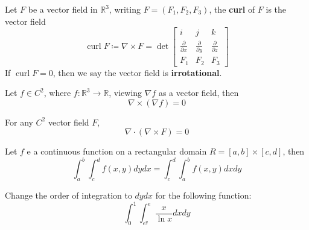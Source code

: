 \documentclass[openany]{book}
\newcommand{\R}{\mathbb{R}}
\newcommand{\curl}{\operatorname{curl}}
\begin{document}
\begin{defn}[curl]
    Let $F$ be a vector field in $\R^3$, writing $F=(F_1,F_2,F_3)$, the \textbf{curl} of $F$ is the vector field 
    \begin{equation*}
        \curl F\coloneq\nabla\times F=\det\begin{bmatrix}
            i&j&k\\
            \frac{\partial}{\partial x}&\frac{\partial}{\partial y}&\frac{\partial}{\partial z}\\
            F_1&F_2&F_3
        \end{bmatrix}
    \end{equation*}
    If $\curl F=0$, then we say the vector field is \textbf{irrotational}.
\end{defn}

\begin{prop}
    Let $f\in C^2$, where $f:\R^3\to\R$, viewing $\nabla f$ as a vector field, then
    \begin{equation*}
        \nabla\times(\nabla f)=0
    \end{equation*}    
\end{prop}

\begin{prop}
    For any $C^2$ vector field $F$, 
    \begin{equation*}
        \nabla\cdot(\nabla\times F)=0
    \end{equation*}
\end{prop}



\begin{prop}
    Let $f$ e a continuous function on a rectangular domain $R=[a,b]\times[c,d]$, then 
    \begin{equation*}
        \int_a^b\int_c^df(x,y)dydx=\int_c^d\int_a^bf(x,y)dxdy
    \end{equation*}
\end{prop}

\begin{prob}
    Change the order of integration to $dydx$ for the following function:
    \begin{equation*}
        \int_0^1\int_{e^y}^{e}\frac{x}{\ln x}dxdy
    \end{equation*}
\end{prob}
\end{document}
